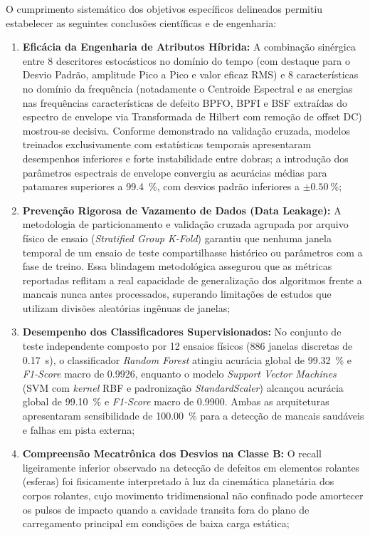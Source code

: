 O cumprimento sistemático dos objetivos específicos delineados permitiu estabelecer as seguintes conclusões científicas e de engenharia:
\begin{enumerate}
    \item \textbf{Eficácia da Engenharia de Atributos Híbrida:} A combinação sinérgica entre 8 descritores estocásticos no domínio do tempo (com destaque para o Desvio Padrão, amplitude Pico a Pico e valor eficaz RMS) e 8 características no domínio da frequência (notadamente o Centroide Espectral e as energias nas frequências características de defeito BPFO, BPFI e BSF extraídas do espectro de envelope via Transformada de Hilbert com remoção de offset DC) mostrou-se decisiva. Conforme demonstrado na validação cruzada, modelos treinados exclusivamente com estatísticas temporais apresentaram desempenhos inferiores e forte instabilidade entre dobras; a introdução dos parâmetros espectrais de envelope convergiu as acurácias médias para patamares superiores a \SI{99,4}{\percent}, com desvios padrão inferiores a $\pm \SI{0,50}{\percent}$;
    \item \textbf{Prevenção Rigorosa de Vazamento de Dados (Data Leakage):} A metodologia de particionamento e validação cruzada agrupada por arquivo físico de ensaio (\textit{Stratified Group K-Fold}) garantiu que nenhuma janela temporal de um ensaio de teste compartilhasse histórico ou parâmetros com a fase de treino. Essa blindagem metodológica assegurou que as métricas reportadas reflitam a real capacidade de generalização dos algoritmos frente a mancais nunca antes processados, superando limitações de estudos que utilizam divisões aleatórias ingênuas de janelas;
    \item \textbf{Desempenho dos Classificadores Supervisionados:} No conjunto de teste independente composto por 12 ensaios físicos (\num{886} janelas discretas de \SI{0,17}{\second}), o classificador \textit{Random Forest} atingiu acurácia global de \SI{99,32}{\percent} e \textit{F1-Score} macro de \num{0,9926}, enquanto o modelo \textit{Support Vector Machines} (SVM com \textit{kernel} RBF e padronização \textit{StandardScaler}) alcançou acurácia global de \SI{99,10}{\percent} e \textit{F1-Score} macro de \num{0,9900}. Ambas as arquiteturas apresentaram sensibilidade de \SI{100,00}{\percent} para a detecção de mancais saudáveis e falhas em pista externa;
    \item \textbf{Compreensão Mecatrônica dos Desvios na Classe B:} O recall ligeiramente inferior observado na detecção de defeitos em elementos rolantes (esferas) foi fisicamente interpretado à luz da cinemática planetária dos corpos rolantes, cujo movimento tridimensional não confinado pode amortecer os pulsos de impacto quando a cavidade transita fora do plano de carregamento principal em condições de baixa carga estática;

\end{enumerate}
